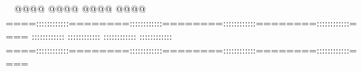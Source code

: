         @@@@                @@@@                @@@@                @@@@        ====::::::::::::========::::::::::::========::::::::::::========::::::::::::====    ::::::::::::        ::::::::::::        ::::::::::::        ::::::::::::    ====::::::::::::========::::::::::::========::::::::::::========::::::::::::====                                                                                